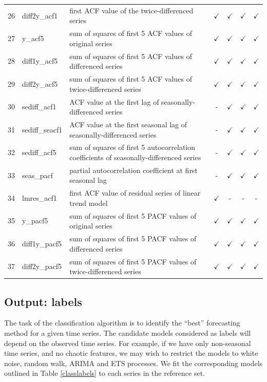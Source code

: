 \documentclass[11pt,a4paper,]{article}
\def\yes{$\checkmark$}
\begin{document}
\begin{table}[!htp]
\begin{tabular}{llp{}cccc}
26 & diff2y\_acf1   & first ACF value of the twice-differenced series                                         & \yes  & \yes & \yes & \yes\\
27 & y\_acf5        & sum of squares of first 5 ACF values of original series                                 & \yes  & \yes & \yes & \yes\\
28 & diff1y\_acf5   & sum of squares of first 5 ACF values of differenced series                              & \yes  & \yes & \yes & \yes\\
29 & diff2y\_acf5   & sum of squares of first 5 ACF values of twice-differenced series                        & \yes  & \yes & \yes & \yes \\
30 & sediff\_acf1 & ACF value at the first lag of seasonally-differenced series                               & -     & \yes & \yes & \yes\\
31 & sediff\_seacf1 & ACF value at the first seasonal lag of seasonally-differenced series                    & -     & \yes & \yes & \yes\\
32 & sediff\_acf5   & sum of squares of first 5 autocorrelation coefficients of seasonally-differenced series & -     & \yes & \yes & \yes\\
33 & seas\_pacf     & partial autocorrelation coefficient at first seasonal lag & -     & \yes & \yes & \yes\\
34 & lmres\_acf1    & first ACF value of residual series of linear trend model                                & \yes  & - & - & -\\
35 & y\_pacf5       & sum of squares of first 5 PACF values of original series                                & \yes  & \yes & \yes & \yes\\
36 & diff1y\_pacf5  & sum of squares of first 5 PACF values of differenced series                             & \yes  & \yes & \yes & \yes\\
37 & diff2y\_pacf5  & sum of squares of first 5 PACF values of twice-differenced series                       & \yes  & \yes & \yes & \yes\\
\bottomrule
\end{tabular}
\end{table}

\hypertarget{output-labels}{%
\subsection{Output: labels}\label{output-labels}}

The task of the classification algorithm is to identify the ``best'' forecasting method for a given time series. The candidate models considered as labels will depend on the observed time series. For example, if we have only non-seasonal time series, and no chaotic features, we may wish to restrict the models to white noise, random walk, ARIMA and ETS processes. We fit the corresponding models outlined in Table \ref{classlabels} to each series in the reference set.
\end{document}
